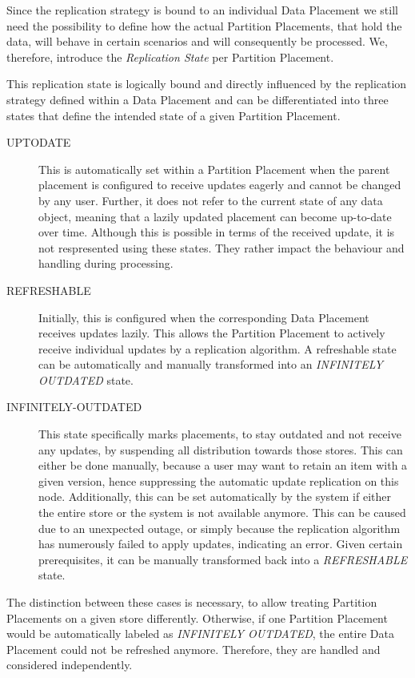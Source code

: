 Since the replication strategy is bound to an individual Data Placement we still need the possibility to 
define how the actual Partition Placements, that hold the data, will behave in certain scenarios and will consequently be processed.
We, therefore, introduce the \emph{Replication State} per Partition Placement.

This replication state is logically bound and directly influenced by the replication strategy defined within a Data Placement
and can be differentiated into three states that define the intended state of a given Partition Placement. 
\begin{description}
    \item [UPTODATE] This is automatically set within a Partition Placement when the parent placement is configured to receive updates eagerly and cannot be changed by any user. 
    Further, it does not refer to the current state of any data object, meaning that a lazily updated placement can become up-to-date over time.
    Although this is possible in terms of the received update, it is not respresented using these states. They rather impact the behaviour and handling during processing.
    
    \item [REFRESHABLE] Initially, this is configured when the corresponding Data Placement receives updates lazily. This allows the Partition Placement to actively receive 
    individual updates by a replication algorithm. A refreshable state can be automatically and manually transformed into an \emph{INFINITELY OUTDATED} state.

    \item [INFINITELY-OUTDATED] This state specifically marks placements, to stay outdated and not receive any updates, by suspending all distribution towards those stores.
    This can either be done manually, because a user may want to
    retain an item with a given version, hence suppressing the automatic update replication on this node. Additionally, this can be set automatically by the system 
    if either the entire store or the system is not available anymore. This can be caused due to an unexpected outage, or simply because the replication algorithm has 
    numerously failed to apply updates, indicating an error. Given certain prerequisites, it can be manually transformed back into a \emph{REFRESHABLE} state.

\end{description}

The distinction between these cases is necessary, to allow treating Partition Placements on a given store differently. 
Otherwise, if one Partition Placement would be automatically labeled as \emph{INFINITELY OUTDATED}, the entire Data Placement could not be refreshed anymore.
Therefore, they are handled and considered independently.


